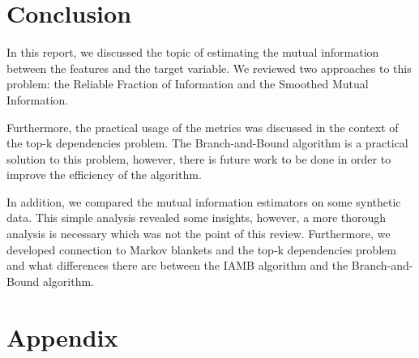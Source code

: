 \documentclass{article}
\begin{document}
\section{Conclusion}
In this report, we discussed the topic of estimating the mutual information between the features and the target variable. We reviewed two approaches to this problem: the Reliable Fraction of Information and the Smoothed Mutual Information.

Furthermore, the practical usage of the metrics was discussed in the context of the top-k dependencies problem. The Branch-and-Bound algorithm is a practical solution to this problem, however, there is future work to be done in order to improve the efficiency of the algorithm.

In addition, we compared the mutual information estimators on some synthetic data. This simple analysis revealed some insights, however, a more thorough analysis is necessary which was not the point of this review. Furthermore, we developed connection to Markov blankets and the top-k dependencies problem and what differences there are between the IAMB algorithm and the Branch-and-Bound algorithm.


	



\appendix
\newpage
\section{Appendix}
\end{document}
